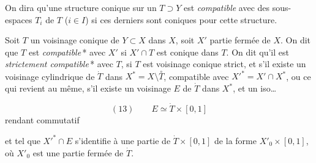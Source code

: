 \documentclass[11pt,a4paper]{article}
\begin{document}

On dira qu'une structure conique sur un $T\supset Y$ est \emph{compatible} avec des sous-espaces  $T_i$ de $T$ ($i\in I$) si ces derniers sont coniques pour cette structure.

Soit $T$ un voisinage conique de $Y\subset X$ dans $X$, soit $X'$ \struck{\ill{}} partie fermée de $X$. On dit que $T$ est \emph{compatible}\,* avec $X'$ si $X'\cap T$ est conique dans $T$. On dit qu'il est \emph{strictement compatible}\,* avec $T$, si $T$ est voisinage conique strict, et s'il existe un voisinage cylindrique de $\dot T$ dans $X^{*}=X\setminus\overset{\circ}{T}$, compatible avec $X'^{*}=X'\cap X^{*}$, ou ce qui revient au même, s'il existe un voisinage $E$ de $\dot T$ dans $X^{*}$, et un iso\ldots



\[
(13)\qquad E\simeq\dot T\times[0,1]
\]
rendant commutatif


et tel que $X'^{*}\cap E$ s'identifie à une partie de $\dot T\times[0,1]$ de la forme $X'_0\times[0,1]$, où $X'_0$ est une partie fermée de $\dot T$.
\end{document}
